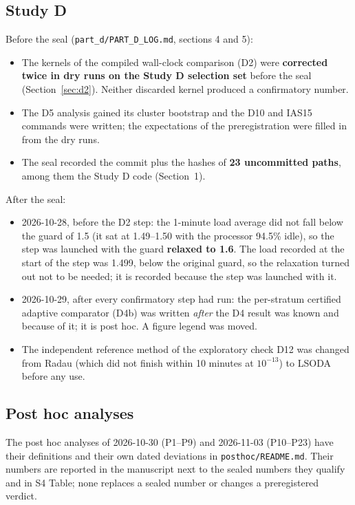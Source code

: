 \documentclass[10pt,letterpaper]{article}
\begin{document}
\subsection{Study D}
Before the seal (\texttt{part\_d/PART\_D\_LOG.md}, sections 4 and 5):
\begin{itemize}
\item The kernels of the compiled wall-clock comparison (D2) were \textbf{corrected twice in dry runs on the Study D selection set} before the seal
(Section~\ref{sec:d2}). Neither discarded kernel produced a confirmatory number.
\item The D5 analysis gained its cluster bootstrap and the D10 and IAS15 commands were written; the expectations of the preregistration were filled
in from the dry runs.
\item The seal recorded the commit plus the hashes of \textbf{23 uncommitted paths}, among them the Study D code (Section~1).
\end{itemize}
After the seal:
\begin{itemize}
\item 2026-10-28, before the D2 step: the 1-minute load average did not fall below the guard of 1.5 (it sat at 1.49--1.50 with the processor 94.5\%
idle), so the step was launched with the guard \textbf{relaxed to 1.6}. The load recorded at the start of the step was 1.499, below the original
guard, so the relaxation turned out not to be needed; it is recorded because the step was launched with it.
\item 2026-10-29, after every confirmatory step had run: the per-stratum certified adaptive comparator (D4b) was written \emph{after} the D4 result was
known and because of it; it is post hoc. A figure legend was moved.
\item The independent reference method of the exploratory check D12 was changed from Radau (which did not finish within 10 minutes at $10^{-13}$) to
LSODA before any use.
\end{itemize}

\subsection{Post hoc analyses}
The post hoc analyses of 2026-10-30 (P1--P9) and 2026-11-03 (P10--P23) have their definitions and their own dated deviations in
\texttt{posthoc/README.md}. Their numbers are reported in the manuscript next to the sealed numbers they qualify and in S4 Table; none replaces a
sealed number or changes a preregistered verdict.
\end{document}
